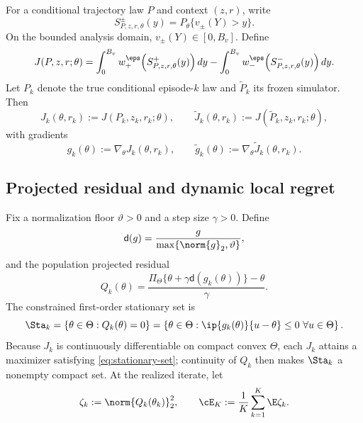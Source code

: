 For a conditional trajectory law $P$ and context $(z,r)$, write
\[
 S_{P,z,r,\theta}^{\pm}(y)
 =P_\theta\{v_\pm(Y)>y\}.
\]
On the bounded analysis domain, $v_\pm(Y)\in[0,B_v]$.  Define
\begin{equation}\label{eq:generic-cpt-objective}
 J(P,z,r;\theta)
 =\int_0^{B_v}w_+^\eps\!\left(S_{P,z,r,\theta}^{+}(y)\right)dy
 -\int_0^{B_v}w_-^\eps\!\left(S_{P,z,r,\theta}^{-}(y)\right)dy.
\end{equation}
Let $P_k$ denote the true conditional episode-$k$ law and $\widetilde P_k$ its frozen simulator.  Then
\begin{equation}\label{eq:true-sim-objectives}
 J_k(\theta,r_k):=J(P_k,z_k,r_k;\theta),
 \qquad
 \widetilde J_k(\theta,r_k):=J(\widetilde P_k,z_k,r_k;\theta),
\end{equation}
with gradients
\begin{equation}\label{eq:true-sim-gradients}
 g_k(\theta):=\nabla_\theta J_k(\theta,r_k),
 \qquad
 \widetilde g_k(\theta):=\nabla_\theta\widetilde J_k(\theta,r_k).
\end{equation}

\subsection{Projected residual and dynamic local regret}

Fix a normalization floor $\vartheta>0$ and a step size $\gamma>0$.  Define
\begin{equation}\label{eq:normalized-direction}
 \mathsf d(g)=\frac{g}{\max\{\norm{g}_2,\vartheta\}},
\end{equation}
and the population projected residual
\begin{equation}\label{eq:projected-residual}
 Q_k(\theta)
 =\frac{\Pi_\Theta\{\theta+\gamma\mathsf d(g_k(\theta))\}-\theta}{\gamma}.
\end{equation}
The constrained first-order stationary set is
\begin{equation}\label{eq:stationary-set}
 \Sta_k
 =\{\theta\in\Theta:Q_k(\theta)=0\}
 =\left\{\theta\in\Theta:
 \ip{g_k(\theta)}{u-\theta}\le0\ \forall u\in\Theta\right\}.
\end{equation}
Because $J_k$ is continuously differentiable on compact convex $\Theta$, each $J_k$ attains a maximizer satisfying \eqref{eq:stationary-set}; continuity of $Q_k$ then makes $\Sta_k$ a nonempty compact set.  At the realized iterate, let
\begin{equation}\label{eq:periodwise-residual}
 \zeta_k:=\norm{Q_k(\theta_k)}_2^2,
 \qquad
 \cE_K:=\frac1K\sum_{k=1}^{K}\E\zeta_k.
\end{equation}

